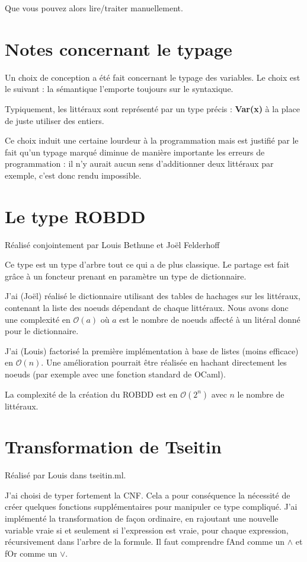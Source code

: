 \documentclass[a4paper,10pt]{article}
\begin{document}
Que vous pouvez alors lire/traiter manuellement.

\section{Notes concernant le typage}
Un choix de conception a été fait concernant le typage des variables. Le choix est le suivant : la sémantique l'emporte toujours sur le syntaxique.

Typiquement, les littéraux sont représenté par un type précis : \textbf{Var(x)} à la place de juste utiliser des entiers.

Ce choix induit une certaine lourdeur à la programmation mais est justifié par le fait qu'un typage marqué diminue de manière importante les erreurs de programmation : 
il n'y aurait aucun sens d'additionner deux littéraux par exemple, c'est donc rendu impossible.

\section{Le type ROBDD}
Réalisé conjointement par Louis Bethune et Joël Felderhoff

Ce type est un type d'arbre tout ce qui a de plus classique. Le partage est fait grâce à un foncteur prenant en paramètre un type de dictionnaire.

J'ai (Joël) réalisé le dictionnaire utilisant des tables de hachages sur les littéraux, contenant la liste des noeuds dépendant de chaque littéraux. 
Nous avons donc une complexité en $\mathcal{O}(a)$ où $a$ est le nombre de noeuds affecté à un litéral donné pour le dictionnaire.

J'ai (Louis) factorisé la première implémentation à base de listes (moins efficace) en $\mathcal{O}(n)$.
Une amélioration pourrait être réalisée en hachant directement les noeuds (par exemple avec une fonction standard de OCaml).

La complexité de la création du ROBDD est en $\mathcal{O}(2^n)$ avec $n$ le nombre de littéraux.

\section{Transformation de Tseitin}
Réalisé par Louis dans tseitin.ml.

J'ai choisi de typer fortement la CNF. Cela a pour conséquence la nécessité de créer quelques fonctions supplémentaires pour manipuler ce type compliqué.
J'ai implémenté la transformation de façon ordinaire, en rajoutant une nouvelle variable vraie si et seulement si l'expression est vraie, pour chaque expression, récursivement dans l'arbre de la formule.
Il faut comprendre fAnd comme un $\wedge$ et fOr comme un $\vee$. 
\end{document}
